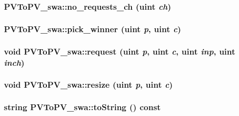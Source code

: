 \hypertarget{classPVToPV__swa_31bf97288ff71191f3fc7210d29976a9}{
\subsubsection[{no\_\-requests\_\-ch}]{ PVToPV\_\-swa::no\_\-requests\_\-ch ({\bf uint} {\em ch})}}
\label{classPVToPV__swa_31bf97288ff71191f3fc7210d29976a9}


\hypertarget{classPVToPV__swa_957d1cb1cd6ffa264749dd89e2ae1cd1}{
\subsubsection[{pick\_\-winner}]{ PVToPV\_\-swa::pick\_\-winner ({\bf uint} {\em p}, \/  {\bf uint} {\em c})}}
\label{classPVToPV__swa_957d1cb1cd6ffa264749dd89e2ae1cd1}


\hypertarget{classPVToPV__swa_d0090325f9ce86b633ddc400910ad30c}{
\subsubsection[{request}]{\setlength{\rightskip}{0pt plus 5cm}void PVToPV\_\-swa::request ({\bf uint} {\em p}, \/  {\bf uint} {\em c}, \/  {\bf uint} {\em inp}, \/  {\bf uint} {\em inch})}}
\label{classPVToPV__swa_d0090325f9ce86b633ddc400910ad30c}


\hypertarget{classPVToPV__swa_f3763d9d6f2c33078a4b0dbe414f4724}{
\subsubsection[{resize}]{\setlength{\rightskip}{0pt plus 5cm}void PVToPV\_\-swa::resize ({\bf uint} {\em p}, \/  {\bf uint} {\em c})}}
\label{classPVToPV__swa_f3763d9d6f2c33078a4b0dbe414f4724}


\hypertarget{classPVToPV__swa_c0517af81f551c91f98f44dd0d6f257f}{
\subsubsection[{toString}]{\setlength{\rightskip}{0pt plus 5cm}string PVToPV\_\-swa::toString () const}}
\label{classPVToPV__swa_c0517af81f551c91f98f44dd0d6f257f}




